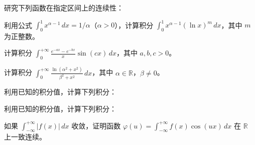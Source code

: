 \noindent\begin{minipage}{\textwidth}
研究下列函数在指定区间上的连续性：
\end{minipage}\par\vfill
\noindent\begin{minipage}{\textwidth}
利用公式 $\displaystyle\int_0^1x^{\alpha-1}\,dx=1/\alpha$（$\alpha>0$），计算积分 $\displaystyle\int_0^1x^{\alpha-1}(\ln x)^m\,dx$，其中 $m$ 为正整数。
\end{minipage}\par\vfill
\newpage
\noindent\begin{minipage}{\textwidth}
计算积分 $\displaystyle\int_0^{+\infty}\frac{e^{-ax}-e^{-bx}}x\sin(cx)\,dx$，其中 $a,b,c>0$。
\end{minipage}\par\vfill
\noindent\begin{minipage}{\textwidth}
计算积分 $\displaystyle\int_0^{+\infty}\frac{\ln(\alpha^2+x^2)}{\beta^2+x^2}\,dx$，其中 $\alpha\in\mathbb R$，$\beta\ne0$。
\end{minipage}\par\vfill
\noindent\begin{minipage}{\textwidth}
利用已知的积分值，计算下列积分：
\end{minipage}\par\vfill
\newpage
\noindent\begin{minipage}{\textwidth}
利用已知的积分值，计算下列积分：
\end{minipage}\par\vfill
\noindent\begin{minipage}{\textwidth}
如果 $\int_{-\infty}^{+\infty}|f(x)|\,dx$ 收敛，证明函数 $\displaystyle\varphi(u)=\int_{-\infty}^{+\infty}f(x)\cos(ux)\,dx$ 在 $\mathbb R$ 上一致连续。
\end{minipage}\par\vfill
